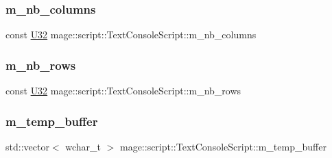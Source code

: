 \hypertarget{classmage_1_1script_1_1_text_console_script_a480c394aece0f517b9d10c4e912aadc9}{}\label{classmage_1_1script_1_1_text_console_script_a480c394aece0f517b9d10c4e912aadc9} 
\subsubsection{\texorpdfstring{m\+\_\+nb\+\_\+columns}{m\_nb\_columns}}
{\footnotesize\ttfamily const \hyperlink{namespacemage_a41c104c036fba3756a74e19f793eeaa1}{U32} mage\+::script\+::\+Text\+Console\+Script\+::m\+\_\+nb\+\_\+columns\hspace{0.3cm}{\ttfamily [private]}}

\hypertarget{classmage_1_1script_1_1_text_console_script_a9d00451cf1cf319512e0c88352d22911}{}\label{classmage_1_1script_1_1_text_console_script_a9d00451cf1cf319512e0c88352d22911} 
\subsubsection{\texorpdfstring{m\+\_\+nb\+\_\+rows}{m\_nb\_rows}}
{\footnotesize\ttfamily const \hyperlink{namespacemage_a41c104c036fba3756a74e19f793eeaa1}{U32} mage\+::script\+::\+Text\+Console\+Script\+::m\+\_\+nb\+\_\+rows\hspace{0.3cm}{\ttfamily [private]}}

\hypertarget{classmage_1_1script_1_1_text_console_script_ae62bf3d6f88f297eb37892d507d8a032}{}\label{classmage_1_1script_1_1_text_console_script_ae62bf3d6f88f297eb37892d507d8a032} 
\subsubsection{\texorpdfstring{m\+\_\+temp\+\_\+buffer}{m\_temp\_buffer}}
{\footnotesize\ttfamily std\+::vector$<$ wchar\+\_\+t $>$ mage\+::script\+::\+Text\+Console\+Script\+::m\+\_\+temp\+\_\+buffer\hspace{0.3cm}{\ttfamily [private]}}

